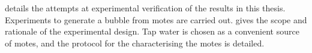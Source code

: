 


 details the attempts at experimental verification of the results in this thesis. 
Experiments to generate a bubble from  motes are carried out.
 gives the scope and rationale of the experimental design.
Tap water is chosen as a convenient source of motes,
and the protocol for the characterising the motes is detailed.

